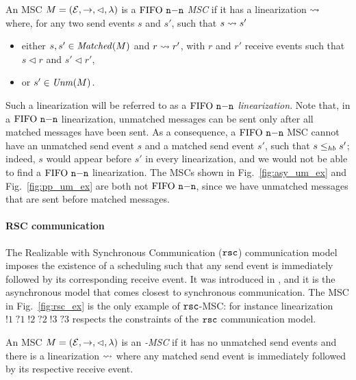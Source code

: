 \begin{definition}[$\nn$ MSC]\label{def:n_n}
	An MSC $M = (\mathcal{E},\to,\lhd,\lambda)$ is a \emph{$\nn$ MSC} if it has a linearization $\rightsquigarrow$ where, for any two send events $s$ and $s'$, such that $s \rightsquigarrow s'$
	\begin{itemize}%
		\item either $s,s' \in \mathit{Matched}(M)$ and $r \rightsquigarrow r'$, with $r$ and $r'$   receive events such that $s \lhd r$ and $s' \lhd r'$,
		\item or $s' \in \mathit{Unm}(M)$.
	\end{itemize}
\end{definition}

Such a linearization will be referred to as a \emph{$\nn$ linearization}. Note that, in a $\nn$ linearization, unmatched messages can be sent only after all matched messages have been sent.
As a consequence, a $\nn$ MSC cannot have an unmatched send event $s$ and a matched send event $s'$, such that $s \leq_{hb} s'$; indeed, $s$ would appear before $s'$ in every linearization, and we would not be able to find a $\nn$ linearization. The MSCs shown in Fig.~\ref{fig:asy_um_ex} and Fig.~\ref{fig:pp_um_ex} are both not $\nn$, since we have unmatched messages that are sent before matched messages.


\paragraph{\bf RSC communication}
The Realizable with Synchronous Communication ($\mathtt{rsc}$) communication model imposes the existence of a scheduling such that any send event is  immediately followed by its corresponding receive event. It was introduced in \cite{DBLP:journals/dc/Charron-BostMT96}, and it is the asynchronous model that comes closest to synchronous communication. %
The MSC  in Fig.~\ref{fig:rsc_ex} is the only example of $\mathtt{rsc}$-MSC: for instance linearization $!1\;?1\;!2\;?2\;!3\;?3$ respects the constraints of the $\mathtt{rsc}$ communication model. 

\begin{definition}\label{def:rsc}
	An MSC $M = (\mathcal{E},\to,\lhd,\lambda)$ is an \emph{\rsc-MSC} if it has no unmatched send events and there is a linearization $\rightsquigarrow$ where any matched send event is immediately followed by its respective receive event.
\end{definition}

